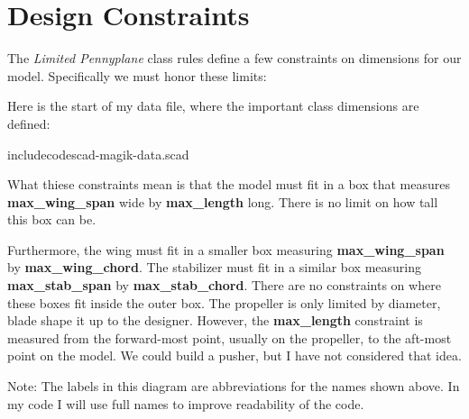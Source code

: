 \section{Design Constraints}

The {\it Limited Pennyplane} class rules define a few constraints on dimensions
for our model. Specifically we must honor these limits:

Here is the start of my data file, where the important class dimensions are
defined:

includecode{scad\math-magik-data.scad}

What thiese constraints mean is that the model must fit in a box that measures {\bf
max\_wing\_span} wide by {\bf max\_length} long. There is no limit on how
tall this box can be.

Furthermore, the wing must fit in a smaller box measuring {\bf max\_wing\_span}
by {\bf max\_wing\_chord}. The stabilizer must fit in a similar box measuring
{\bf max\_stab\_span} by {\bf max\_stab\_chord}. There are no constraints on where
these boxes fit inside the outer box. The propeller is only limited by
diameter, blade shape it up to the designer. However, the {\bf max\_length}
constraint is measured from the forward-most point, usually on the propeller,
to the aft-most point on the model. We could build a pusher, but I have not
considered that idea.


Note: The labels in this diagram are abbreviations for the names shown above.
In my code I will use full names to improve readability of the code.
